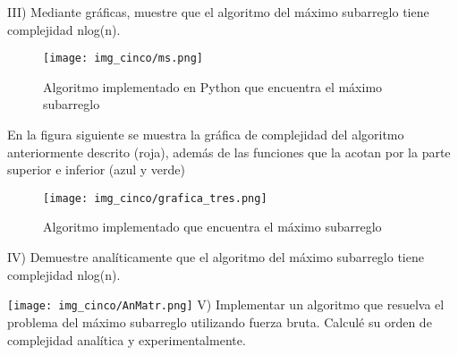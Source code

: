 \documentclass[12pt,twoside]{article}
\begin{document}
\newline
\newline
III) Mediante gráficas, muestre que el algoritmo del máximo subarreglo tiene
complejidad nlog(n).

\newline
\newline


\begin{figure}[H]
\centering
\texttt{[image: img\_cinco/ms.png]}
\caption{Algoritmo implementado en Python que encuentra el máximo subarreglo}
\end{figure}
En la figura siguiente se muestra la gráfica de complejidad del algoritmo anteriormente descrito (roja), además de las funciones que la acotan por la parte superior e inferior (azul y verde)
\vspace{10 mm}
\begin{figure}[H]
\centering
\texttt{[image: img\_cinco/grafica\_tres.png]}
\caption{Algoritmo implementado que encuentra el máximo subarreglo}
\end{figure}
\vspace{100 mm}
IV) Demuestre analíticamente que el algoritmo del máximo subarreglo tiene complejidad nlog(n).\\
\vspace{10 mm}

\texttt{[image: img\_cinco/AnMatr.png]}
\newline
\newline
V) Implementar un algoritmo que resuelva el problema del máximo
subarreglo utilizando fuerza bruta. Calculé su orden de complejidad analítica
y experimentalmente.
\end{document}
